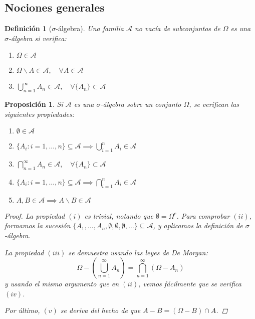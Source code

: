 \documentclass[11pt, a4paper]{article}
\theoremstyle{theorem-style}
\newtheorem{nprop}{Proposición}[section]
\theoremstyle{definition-style}
\newtheorem{ndef}{Definición}[section]
\theoremstyle{remark-style}
\theoremstyle{example-style}
\newenvironment{nlist}
{\begin{enumerate}
    \renewcommand\labelenumi{(\emph{\roman{enumi})}}}
  {\end{enumerate}}
\begin{document}

\subsection{Nociones generales}

\begin{ndef}[$\sigma$-álgebra] Una familia $\mathcal A$ no vacía de subconjuntos de $\Omega$ es una \mbox{$\sigma$-álgebra} si verifica:

  \begin{nlist}
  \item $\Omega \in \mathcal A$
  \item $\displaystyle \Omega \backslash A \in \mathcal{A}, \quad \forall A \in \mathcal{A}$
  \item $\displaystyle \bigcup_{n=1}^\infty A_n \in \mathcal{A}, \quad \forall \{A_n\} \subset \mathcal{A}$
  \end{nlist}
  
\end{ndef}

\begin{nprop}
  Si $\mathcal A$ es una $\sigma$-álgebra sobre un conjunto $\Omega$, se verifican las siguientes propiedades: 
  
  \begin{nlist}
  \item $\emptyset \in \mathcal A$
  \item $\displaystyle \{A_i : i = 1,\dots,n\} \subseteq \mathcal{A} \implies \bigcup_{i=1}^n A_i \in \mathcal{A}$
  \item $\displaystyle \bigcap_{n=1}^\infty A_n \in \mathcal{A}, \quad \forall \{A_n\} \subset \mathcal{A}$
  \item $\displaystyle \{A_i : i = 1,\dots,n\} \subseteq \mathcal{A} \implies \bigcap_{i=1}^n A_i \in \mathcal{A}$
  \item $A,B \in \mathcal A \implies A \backslash B \in \mathcal A$
  \end{nlist}

  \begin{proof}
    La propiedad $(i)$ es trivial, notando que $\emptyset = \Omega^c$. Para comprobar $(ii)$, formamos la sucesión $\{A_1,\dots,A_n,\emptyset,\emptyset, \emptyset, \dots\} \subseteq \mathcal A$, y aplicamos la definición de $\sigma$-álgebra.
    
    La propiedad $(iii)$ se demuestra usando las leyes de De Morgan: $$\Omega - \left( \bigcup_{n=1}^\infty A_n \right) = \bigcap_{n=1}^\infty (\Omega - A_n)$$ y usando el mismo argumento que en $(ii)$, vemos fácilmente que se verifica $(iv)$.
    
    Por último, $(v)$ se deriva del hecho de que $A - B = (\Omega - B) \cap A$.
  \end{proof}
\end{nprop}
\end{document}
